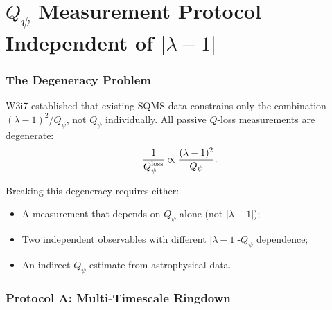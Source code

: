 \documentclass[11pt]{article}
\newcommand{\lam}{\lambda}
\newcommand{\Qpsi}{Q_\psi}
\newcommand{\lbone}{|\lam - 1|}
\theoremstyle{definition}
\theoremstyle{remark}
\begin{document}
\part{$\Qpsi$ Measurement Protocol Independent of $\lbone$}
\label{part:Qpsi}

\section{The Degeneracy Problem}
\label{sec:degeneracy}

W3i7 established that existing SQMS data constrains only the combination
$(\lam-1)^2/\Qpsi$, not $\Qpsi$ individually. All passive $Q$-loss
measurements are degenerate:
\begin{equation}
\frac{1}{Q_\psi^{\rm loss}} \propto \frac{(\lam-1)^2}{\Qpsi}.
\label{eq:degeneracy}
\end{equation}

Breaking this degeneracy requires either:
\begin{itemize}[nosep]
\item[(a)] A measurement that depends on $\Qpsi$ alone (not $\lbone$);
\item[(b)] Two independent observables with different
  $\lbone$-$\Qpsi$ dependence;
\item[(c)] An indirect $\Qpsi$ estimate from astrophysical data.
\end{itemize}

\section{Protocol A: Multi-Timescale Ringdown}
\label{sec:ringdown}
\end{document}
